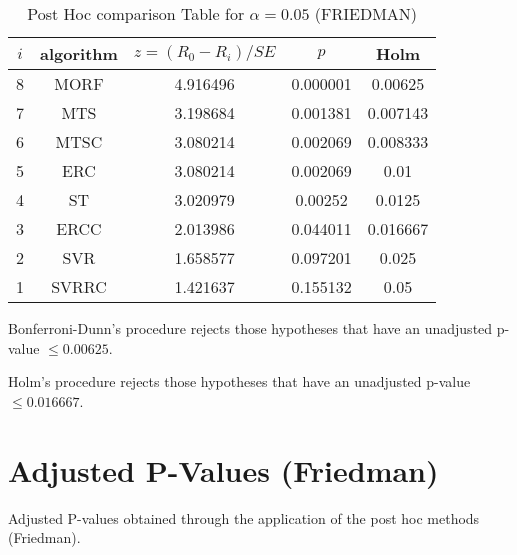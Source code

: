 \documentclass[a4paper,10pt]{article}
\begin{document}
\begin{landscape}
\begin{table}[!htp]
\centering\footnotesize
\begin{tabular}{ccccc}
$i$&algorithm&$z=(R_0 - R_i)/SE$&$p$&Holm \\
\hline8&MORF&4.916496&0.000001&0.00625\\7&MTS&3.198684&0.001381&0.007143\\6&MTSC&3.080214&0.002069&0.008333\\5&ERC&3.080214&0.002069&0.01\\4&ST&3.020979&0.00252&0.0125\\3&ERCC&2.013986&0.044011&0.016667\\2&SVR&1.658577&0.097201&0.025\\1&SVRRC&1.421637&0.155132&0.05\\\hline
\end{tabular}
\caption{Post Hoc comparison Table for $\alpha=0.05$ (FRIEDMAN)}
\end{table}Bonferroni-Dunn's procedure rejects those hypotheses that have an unadjusted p-value $\le0.00625$.

Holm's procedure rejects those hypotheses that have an unadjusted p-value $\le0.016667$.


\newpage

\section{Adjusted P-Values (Friedman)}


Adjusted P-values obtained through the application of the post hoc methods (Friedman).


\end{landscape}
\end{document}
